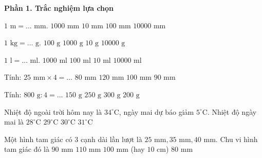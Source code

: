 \textbf{Phần 1. Trắc nghiệm lựa chọn}

\begin{ex} %
$1\text{ m} = \dots\text{ mm}$.
\choice
{\True $1000\text{ mm}$}
{$10\text{ mm}$}
{$100\text{ mm}$}
{$10000\text{ mm}$}
\end{ex}

\begin{ex} %
$1\text{ kg} = \dots\text{ g}$.
\choice
{$100\text{ g}$}
{\True $1000\text{ g}$}
{$10\text{ g}$}
{$10000\text{ g}$}
\end{ex}

\begin{ex} %
$1\text{ l} = \dots\text{ ml}$.
\choice
{\True $1000\text{ ml}$}
{$100\text{ ml}$}
{$10\text{ ml}$}
{$10000\text{ ml}$}
\end{ex}

\begin{ex} %
Tính: $25\text{ mm} \times 4 = \dots$
\choice
{$80\text{ mm}$}
{$120\text{ mm}$}
{\True $100\text{ mm}$}
{$90\text{ mm}$}
\end{ex}

\begin{ex} %
Tính: $800\text{ g} : 4 = \dots$
\choice
{$150\text{ g}$}
{$250\text{ g}$}
{$300\text{ g}$}
{\True $200\text{ g}$}
\end{ex}

\begin{ex} %
Nhiệt độ ngoài trời hôm nay là $34^\circ\text{C}$, ngày mai dự báo giảm $5^\circ\text{C}$. Nhiệt độ ngày mai là
\choice
{$28^\circ\text{C}$}
{\True $29^\circ\text{C}$}
{$30^\circ\text{C}$}
{$31^\circ\text{C}$}
\end{ex}

\begin{ex} %
Một hình tam giác có 3 cạnh dài lần lượt là $25\text{ mm}, 35\text{ mm}, 40\text{ mm}$. Chu vi hình tam giác đó là
\choice
{$90\text{ mm}$}
{$110\text{ mm}$}
{\True $100\text{ mm}$ (hay $10\text{ cm}$)}
{$80\text{ mm}$}
\end{ex}

